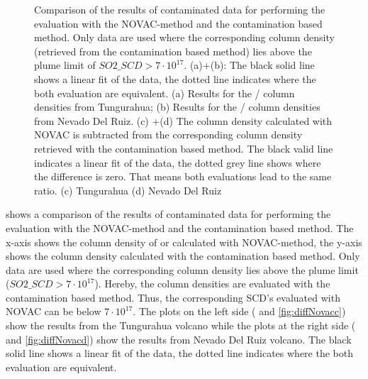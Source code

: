 \documentclass  [
  paper    = a4,
  BCOR     = 10mm,
  twoside,
  fontsize = 12pt,
  fleqn,
  toc      = bibnumbered,
  toc      = listofnumbered,
  numbers  = noendperiod,
  headings = normal,
  listof   = leveldown,
  version  = 3.03
]                                       {scrreprt}
\begin{document}
\begin{figure}[h!]
{		\label{fig:diffratioc}}
	\caption{Comparison of the results of contaminated data for performing the evaluation with the NOVAC-method and the contamination based method. Only data are used where the corresponding   column density (retrieved from the contamination based method) lies above the plume limit of $SO2\_SCD>7\cdot 10^{17}$. (a)+(b): The black solid line shows a linear fit of the data, the dotted line indicates where the both evaluation are equivalent. (a) Results for the   /  column densities from Tungurahua; (b) Results for the   /  column densities from Nevado Del Ruiz. 
		(c) +(d) The column density calculated with NOVAC is subtracted from the corresponding column density retrieved with the contamination based method. The black valid line indicates a linear fit of the data, the dotted grey line shows where the difference is zero. That means both evaluations lead to the same ratio. (c) Tungurahua (d) Nevado Del Ruiz}
	\label{fig:diffratio}
\end{figure}
	 shows a comparison of the results of contaminated data for performing the evaluation with the NOVAC-method and the contamination based method. The x-axis shows the column density of   or   calculated with NOVAC-method, the y-axis shows the column density calculated with the contamination based method. Only data are used where the corresponding   column density lies above the plume limit ($SO2\_SCD>7\cdot 10^{17}$). Hereby, the column densities are evaluated with the contamination based method. Thus, the corresponding   SCD's evaluated with NOVAC can be below $7\cdot 10^{17}$.
	The plots on the left side ( and \ref{fig:diffNovacc}) show the results from the Tungurahua volcano while the plots at the right side ( and \ref{fig:diffNovacd}) show the results from Nevado Del Ruiz volcano. The black solid line shows a linear fit of the data, the dotted line indicates where the both evaluation are equivalent.\\
\end{document}
